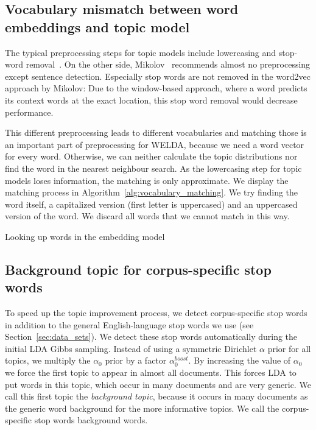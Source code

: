 \documentclass[
        a4paper,
        titlepage,
        twoside,
        parskip,
        numbers=noenddot
        ]{scrbook}
\theoremstyle{break}
\begin{document}
\subsection{Vocabulary mismatch between word embeddings and topic model}
\label{sec:vocabulary_mismatch}
The typical preprocessing steps for topic models include lowercasing and stop-word removal~\cite{Boyd-graber2014}.
On the other side, Mikolov~\cite{Mikolov2013d} recommends almost no preprocessing except sentence detection.
Especially stop words are not removed in the word2vec approach by Mikolov:
Due to the window-based approach, where a word predicts its context words at the exact location, this stop word removal would decrease performance.

This different preprocessing leads to different vocabularies and matching those is an important part of preprocessing for WELDA, because we need a word vector for every word.
Otherwise, we can neither calculate the topic distributions nor find the word in the nearest neighbour search.
As the lowercasing step for topic models loses information, the matching is only approximate.
We display the matching process in Algorithm~\ref{alg:vocabulary_matching}.
We try finding the word itself, a capitalized version (first letter is uppercased) and an uppercased version of the word.
We discard all words that we cannot match in this way.

\begin{algorithm}
  \caption{Looking up words in the embedding model}
  \label{alg:vocabulary_matching}
  \begin{algorithmic}[1]
      \State{}
      \State{}
      \State{}
    \Else
    \EndIf
    \EndProcedure
  \end{algorithmic}
\end{algorithm}

\subsection{Background topic for corpus-specific stop words}
\label{sec:background_topic}
To speed up the topic improvement process, we detect corpus-specific stop words in addition to the general English-language stop words we use (see Section~\ref{sec:data_sets}).
We detect these stop words automatically during the initial LDA Gibbs sampling.
Instead of using a symmetric Dirichlet $\alpha$ prior for all topics, we multiply the $\alpha_0$ prior by a factor $\alpha_0^{boost}$.
By increasing the value of $\alpha_0$ we force the first topic to appear in almost all documents.
This forces LDA to put words in this topic, which occur in many documents and are very generic.
We call this first topic the \emph{background topic}, because it occurs in many documents as the generic word background for the more informative topics.
We call the corpus-specific stop words background words.
\end{document}
